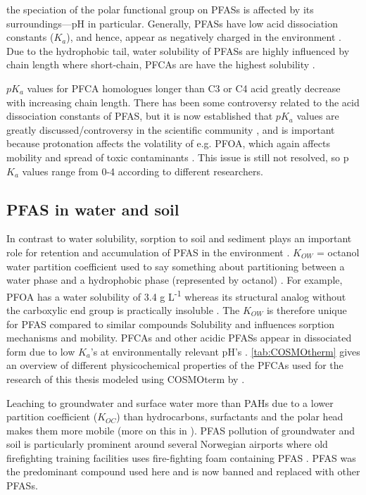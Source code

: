 the speciation of the polar functional group on PFASs is affected by its surroundings---pH in particular. Generally, PFASs have low acid dissociation constants (\(K_a\)), and hence, appear as negatively charged in the environment \citep{Reemtsma2016}. Due to the hydrophobic tail, water solubility of PFASs are highly influenced by chain length where short-chain, PFCAs are have the highest solubility \citep{bhhatarai2011}.

\(pK_a\) values for PFCA homologues longer than C3 or C4 acid greatly decrease with increasing chain length. There has been some controversy related to the acid dissociation constants of PFAS, but it is now established that  \(pK_a\) values are greatly discussed/controversy in the scientific community \citep{Goss2009comment},  and is important because protonation affects the volatility of e.g. PFOA, which again affects mobility and spread of toxic contaminants \citep{Goss2009comment,wang2011physchem}. This issue is still not resolved, so p$K_a$ values range from 0-4 according to different researchers. 

\subsection{PFAS in water and soil}
In contrast to water solubility, sorption to soil and sediment plays an important role for retention and accumulation of PFAS in the environment \citep{li2018,LehmannAndJoseph2015,Cornelissen2005}. 
\(K_{OW}\) = octanol water partition coefficient used to say something about partitioning between a water phase and a hydrophobic phase (represented by octanol) \citep{Reemtsma2016}. For example, PFOA has a water solubility of 3.4 g L\textsuperscript{-1} \citep{PFOA} whereas its structural analog without the carboxylic end group is practically insoluble \citep{PFO}. The \(K_{OW}\) is therefore unique for PFAS compared to similar compounds   
Solubility and influences sorption mechanisms and mobility. PFCAs and other acidic PFASs appear in dissociated form due to low \(K_a\)'s at environmentally relevant pH's \citep{wang2011physchem}.
\cref{tab:COSMOtherm} gives an overview of different physicochemical properties of the PFCAs used for the research of this thesis modeled using COSMOterm by \cite{wang2011physchem}. 

Leaching to groundwater and surface water more than PAHs due to a lower partition coefficient ($K_{OC}$) than hydrocarbons, surfactants and the polar head makes them more mobile (more on this in \citep{du2014adsorption}). PFAS pollution of groundwater and soil is particularly prominent around several Norwegian airports where old firefighting training facilities uses fire-fighting foam containing PFAS \citep{MD2016workshop}. PFAS was the predominant compound used here and is now banned and replaced with other PFASs. 

